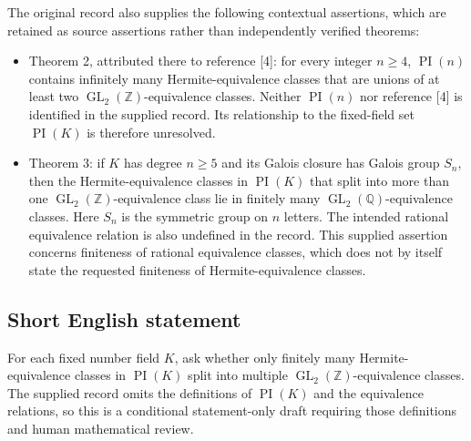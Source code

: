 \documentclass[11pt]{article}
\newcommand{\Z}{\mathbb{Z}}
\newcommand{\Q}{\mathbb{Q}}
\begin{document}
The original record also supplies the following contextual assertions, which are retained as source assertions rather than independently verified theorems:
\begin{itemize}
\item Theorem 2, attributed there to reference [4]: for every integer \(n\geq4\), \(\operatorname{PI}(n)\) contains infinitely many Hermite-equivalence classes that are unions of at least two \(\operatorname{GL}_2(\Z)\)-equivalence classes. Neither \(\operatorname{PI}(n)\) nor reference [4] is identified in the supplied record. Its relationship to the fixed-field set \(\operatorname{PI}(K)\) is therefore unresolved.
\item Theorem 3: if \(K\) has degree \(n\geq5\) and its Galois closure has Galois group \(S_n\), then the Hermite-equivalence classes in \(\operatorname{PI}(K)\) that split into more than one \(\operatorname{GL}_2(\Z)\)-equivalence class lie in finitely many \(\operatorname{GL}_2(\Q)\)-equivalence classes. Here \(S_n\) is the symmetric group on \(n\) letters. The intended rational equivalence relation is also undefined in the record. This supplied assertion concerns finiteness of rational equivalence classes, which does not by itself state the requested finiteness of Hermite-equivalence classes.
\end{itemize}
\subsection{Short English statement}
For each fixed number field \(K\), ask whether only finitely many Hermite-equivalence classes in \(\operatorname{PI}(K)\) split into multiple \(\operatorname{GL}_2(\Z)\)-equivalence classes. The supplied record omits the definitions of \(\operatorname{PI}(K)\) and the equivalence relations, so this is a conditional statement-only draft requiring those definitions and human mathematical review.
\end{document}
